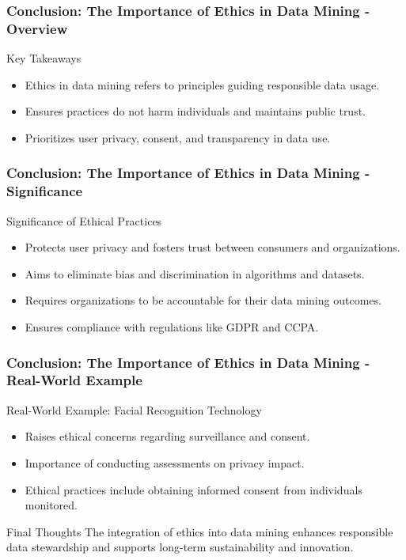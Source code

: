 \documentclass[aspectratio=169]{beamer}
\begin{document}
\begin{frame}[fragile]
    \frametitle{Conclusion: The Importance of Ethics in Data Mining - Overview}
    \begin{block}{Key Takeaways}
        \begin{itemize}
            \item Ethics in data mining refers to principles guiding responsible data usage.
            \item Ensures practices do not harm individuals and maintains public trust.
            \item Prioritizes user privacy, consent, and transparency in data use.
        \end{itemize}
    \end{block}
\end{frame}

\begin{frame}[fragile]
    \frametitle{Conclusion: The Importance of Ethics in Data Mining - Significance}
    \begin{block}{Significance of Ethical Practices}
        \begin{itemize}
            \item Protects user privacy and fosters trust between consumers and organizations.
            \item Aims to eliminate bias and discrimination in algorithms and datasets.
            \item Requires organizations to be accountable for their data mining outcomes.
            \item Ensures compliance with regulations like GDPR and CCPA.
        \end{itemize}
    \end{block}
\end{frame}

\begin{frame}[fragile]
    \frametitle{Conclusion: The Importance of Ethics in Data Mining - Real-World Example}
    \begin{block}{Real-World Example: Facial Recognition Technology}
        \begin{itemize}
            \item Raises ethical concerns regarding surveillance and consent.
            \item Importance of conducting assessments on privacy impact.
            \item Ethical practices include obtaining informed consent from individuals monitored.
        \end{itemize}
    \end{block}
    
    \begin{block}{Final Thoughts}
        The integration of ethics into data mining enhances responsible data stewardship and supports long-term sustainability and innovation.
    \end{block}
\end{frame}
\end{document}
